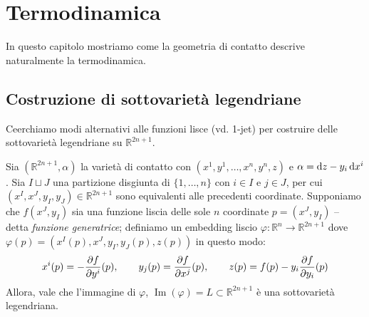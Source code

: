 \chapter{Termodinamica}

In questo capitolo mostriamo come la geometria di contatto descrive naturalmente la termodinamica.

\section{Costruzione di sottovarietà legendriane}

Ceerchiamo modi alternativi alle funzioni lisce (vd. 1-jet) per costruire delle sottovarietà legendriane su $\mathbb{R}^{2n + 1}$.

\begin{proposition}
    Sia $(\mathbb{R}^{2n + 1}, \alpha)$ la varietà di contatto con \( (x^1, y^1, \dots, x^n, y^n, z) \) e \( \alpha = \odif{z} - y_i \odif{x^i} \).
    Sia $I \sqcup J$ una partizione disgiunta di $\{1, \dots, n\}$ con $i \in I$ e $j \in J$, per cui $\left( x^I, x^J, y_I, y_J \right) \in \mathbb{R}^{2n + 1}$ sono equivalenti alle precedenti coordinate.
    Supponiamo che $f(x^J, y_I)$ sia una funzione liscia delle sole $n$ coordinate $p = (x^J, y_I)$ -- detta \emph{funzione generatrice}; definiamo un embedding liscio $\varphi : \mathbb{R}^n \longrightarrow \mathbb{R}^{2n + 1}$ dove $\varphi(p) = \left( x^I (p), x^J, y_I, y_J (p), z(p) \right)$ in questo modo:
    \begin{equation}\label{eq:legendre}
        x^i(p) = - \pdv{f}{y^i}(p), \qquad y_j(p) = \pdv{f}{x^j}(p), \qquad z(p) = f(p) - y_i \pdv{f}{y_i}(p)
    \end{equation}
    Allora, vale che l'immagine di $\varphi$, $\operatorname{Im}(\varphi) = L \subset \mathbb{R}^{2n + 1}$ è una sottovarietà legendriana.
\end{proposition}

